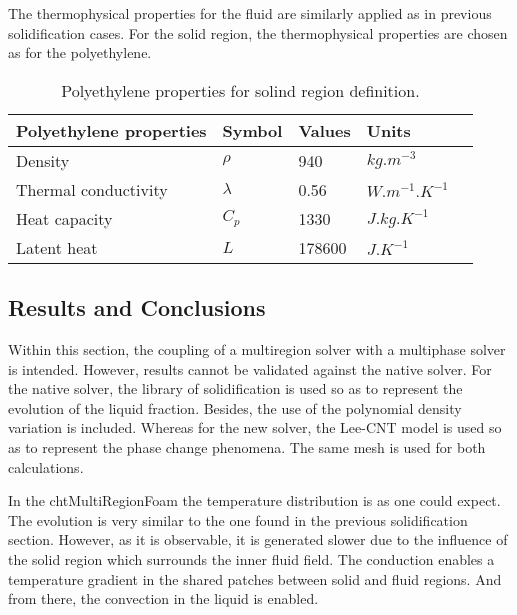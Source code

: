 \setlength{\parindent}{0.5cm} The thermophysical properties for the fluid are similarly applied as in previous solidification cases.
For the solid region, the thermophysical properties are chosen as for the polyethylene.

\begin{table}[h!]
	\begin{tabular}{@{}lllll@{}}
		\toprule[1pt]
		\textbf{Polyethylene properties} & \textbf{Symbol} & \textbf{Values} & \textbf{Units} &  \\ \midrule[2pt]
		Density & $\rho$ & 940 & $kg.m^{-3}$ \\	
		Thermal conductivity & $\lambda$ & 0.56 & $W.m^{-1}.K^{-1}$ \\		
		Heat capacity & $C_{p}$ & 1330 & $J.kg.K^{-1}$ \\		 
		Latent heat & $L$ &  178600  & $J.K^{-1}$ \\		 \bottomrule[1pt]		
	\end{tabular}
	\centering
	\caption{Polyethylene properties for solind region definition.}	
	\label{4.3tab}
\end{table}
\clearpage
\subsection{Results and Conclusions}
Within this section, the coupling of a multiregion solver with a multiphase solver is intended. However, results cannot be validated against the native solver.
For the native solver, the library of solidification is used so as to represent the evolution of the liquid fraction. Besides, the use of the polynomial density variation is included. Whereas for the new solver, the Lee-CNT model is used so as to represent the phase change phenomena. The same mesh is used for both calculations. 

\noindent In the chtMultiRegionFoam the temperature distribution is as one could expect. The evolution is very similar to the one found in the previous solidification section. However, as it is observable, it is generated slower due to the influence of the solid region which surrounds the inner fluid field. The conduction enables a temperature gradient in the shared patches between solid and fluid regions. And from there, the convection in the liquid is enabled. 

